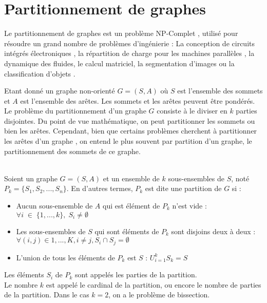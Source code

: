 
\section{Partitionnement de graphes}
Le partitionnement de graphes est un problème NP-Complet \citep{GAREY1976}, utilisé pour résoudre un grand nombre de problèmes d'ingénierie : La conception de circuits intégrés électroniques \citep{CONG2003}, la répartition de charge pour les machines parallèles \citep{BARAT2016}, la dynamique des fluides, le calcul matriciel, la segmentation d'images \citep{GRADY2006} ou la classification d'objets \citep{DHILLON2007}.

Etant donné un graphe non-orienté $G = (S, A)$ où $S$ est l'ensemble des sommets et $A$ est l'ensemble des arêtes. Les sommets et les arêtes peuvent être pondérés. Le problème du partitionnement d'un graphe $G$ consiste à le diviser en $k$ parties disjointes. Du point de vue mathématique, on peut partitionner les sommets ou bien les arêtes. Cependant, bien que certains problèmes cherchent à partitionner les arêtes d'un graphe \citep{HOLYER1981}, on entend le plus souvent par partition d'un graphe, le partitionnement des sommets de ce graphe.

\begin{definition} \citep{BichotSiarry2013}
\\Soient un graphe $G = (S,A)$ et un ensemble de $k$ sous-ensembles de $S$, noté $P_k = \{S_1, S_2, . . . ,S_n\}$. En d'autres termes, $P_k$ est dite une partition de $G$ si :
\begin{itemize}
	\item Aucun sous-ensemble de $A$ qui est élément de $P_k$ n'est vide : $\forall i\; \in \; \{1, ..., k\},\; S_i \ne \emptyset$
	\item Les sous-ensembles de $S$ qui sont éléments de $P_k$ sont disjoins deux à deux : $\forall(i, j) \in{1, ..., K}, i \ne j, S_i \cap S_j = \emptyset$
	\item L'union de tous les éléments de $P_k$  est $S$ : $U^{k}_{i=1} S_k = S$
\end{itemize}
Les éléments $S_i$ de $P_k$ sont appelés les parties de la partition.\\
Le nombre $k$ est appelé le cardinal de la partition, ou encore le nombre de parties de la partition.
Dans le cas $k = 2$, on a le problème de bissection.
\end{definition}